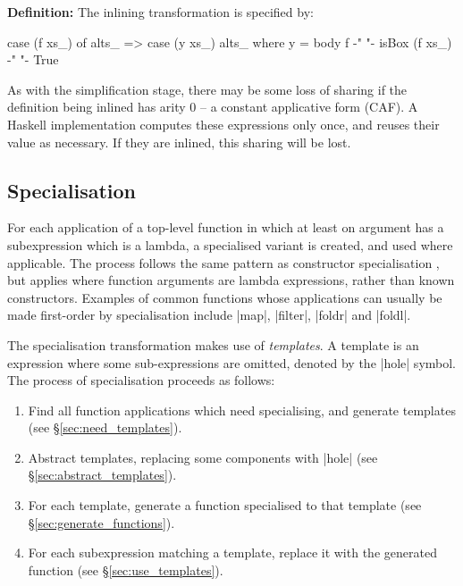 \documentclass[preprint]{sigplanconf}
\newenvironment{definition}
    {\smallskip
     \noindent\textbf{Definition:}}
    {\noexample}
\begin{document}
\begin{definition}
The inlining transformation is specified by:

\ignore\begin{code}
case (f xs_) of alts_
    => case (y xs_) alts_
    where
        y = body f
        {-"  "-} isBox (f xs_) {-"  "-} True
\end{code}\codeexample
\end{definition}\bigskip

As with the simplification stage, there may be some loss of sharing if the definition being inlined has arity 0 -- a constant applicative form (CAF). A Haskell implementation computes these expressions only once, and reuses their value as necessary. If they are inlined, this sharing will be lost.

\subsection{Specialisation}

For each application of a top-level function in which at least on argument has a subexpression which is a lambda, a specialised variant is created, and used where applicable. The process follows the same pattern as constructor specialisation \cite{spj:specconstr}, but applies where function arguments are lambda expressions, rather than known constructors. Examples of common functions whose applications can usually be made first-order by specialisation include |map|, |filter|, |foldr| and |foldl|.

The specialisation transformation makes use of \textit{templates}. A template is an expression where some sub-expressions are omitted, denoted by the |hole| symbol. The process of specialisation proceeds as follows:

\begin{enumerate}
\item Find all function applications which need specialising, and generate templates (see \S\ref{sec:need_templates}).
\item Abstract templates, replacing some components with |hole| (see \S\ref{sec:abstract_templates}).
\item For each template, generate a function specialised to that template (see \S\ref{sec:generate_functions}).
\item For each subexpression matching a template, replace it with the generated function (see \S\ref{sec:use_templates}).
\end{enumerate}
\end{document}

